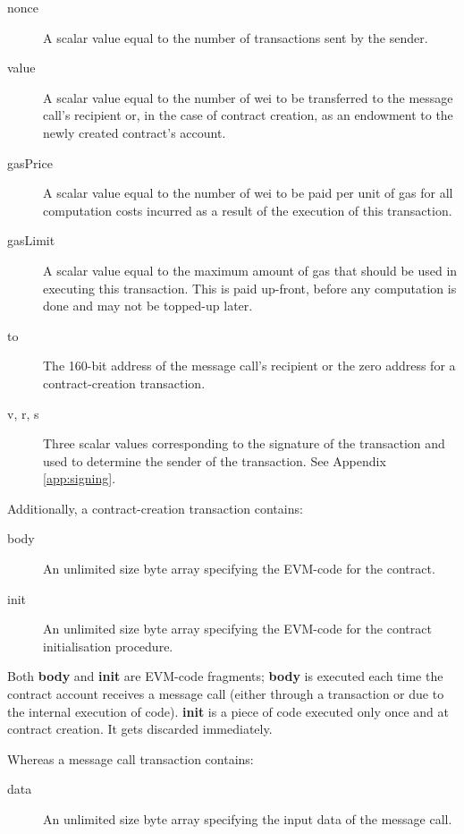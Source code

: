 \documentclass[9pt,oneside]{amsart}
\begin{document}
\begin{multicols}{2}
\begin{description}
\item[nonce] A scalar value equal to the number of transactions sent by the sender.
\item[value] A scalar value equal to the number of wei to be transferred to the message call's recipient or, in the case of contract creation, as an endowment to the newly created contract's account.
\item[gasPrice] A scalar value equal to the number of wei to be paid per unit of gas for all computation costs incurred as a result of the execution of this transaction.
\item[gasLimit] A scalar value equal to the maximum amount of gas that should be used in executing this transaction. This is paid up-front, before any computation is done and may not be topped-up later.
\item[to] The 160-bit address of the message call's recipient or the zero address for a contract-creation transaction.
\item[v, r, s] Three scalar values corresponding to the signature of the transaction and used to determine the sender of the transaction. See Appendix \ref{app:signing}.
\end{description}

Additionally, a contract-creation transaction contains:

\begin{description}
\item[body] An unlimited size byte array specifying the EVM-code for the contract.
\item[init] An unlimited size byte array specifying the EVM-code for the contract initialisation procedure.
\end{description}

Both \textbf{body} and \textbf{init} are EVM-code fragments; \textbf{body} is executed each time the contract account receives a message call (either through a transaction or due to the internal execution of code). \textbf{init} is a piece of code executed only once and at contract creation. It gets discarded immediately.

Whereas a message call transaction contains:

\begin{description}
\item[data] An unlimited size byte array specifying the input data of the message call.
\end{description}



\end{multicols}
\end{document}
